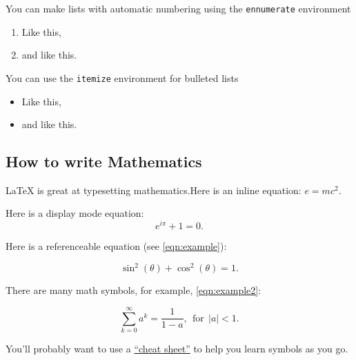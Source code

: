 \documentclass[11pt,twocolumn]{article}
\begin{document}
You can make lists with automatic numbering using the \verb|ennumerate| environment

\begin{enumerate}
	\item Like this,
	\item and like this.
\end{enumerate}

You can use the \verb|itemize| environment for bulleted lists

\begin{itemize}
	\item Like this,
	\item and like this.
\end{itemize}

\subsection{How to write Mathematics}

\LaTeX{} is great at typesetting mathematics.Here is an inline equation: \(e = mc^2\).

Here is a display mode equation: \[e^{i \pi} + 1 = 0.\]

Here is a referenceable equation (see \cref{eqn:example}):

\begin{equation}
	\label{eqn:example}
	\sin^2(\theta) + \cos^2(\theta) = 1.
\end{equation}

There are many math symbols, for example, \cref{eqn:example2}:

\begin{equation}
	\label{eqn:example2}
	\sum_{k=0}^\infty a^k = \frac{1}{1-a}, \mathrm{~~for~~} |a| < 1.
\end{equation}

You'll probably want to use a \href{https://www.rpi.edu/dept/arc/training/latex/LaTeX_symbols.pdf}{``cheat sheet''} to help you learn symbols as you go.
\end{document}
